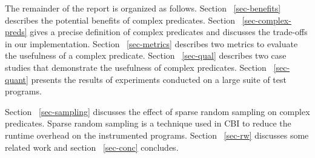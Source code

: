 The remainder of the report is organized as follows.  Section ~\ref{sec-benefits} describes the potential benefits of complex predicates.  Section ~\ref{sec-complex-preds} gives a precise definition of complex predicates and discusses the trade-offs in our implementation.  Section ~\ref{sec-metrics} describes two metrics to evaluate the usefulness of a complex predicate.  Section ~\ref{sec-qual} describes two case studies that demonstrate the usefulness of complex predicates.  Section ~\ref{sec-quant} presents the results of experiments conducted on a large suite of test programs.  

Section ~\ref{sec-sampling} discusses the effect of sparse random sampling on complex predicates.  Sparse random sampling is a technique used in CBI to reduce the runtime overhead on the instrumented programs.  Section ~\ref{sec-rw} discusses some related work and section ~\ref{sec-conc} concludes.